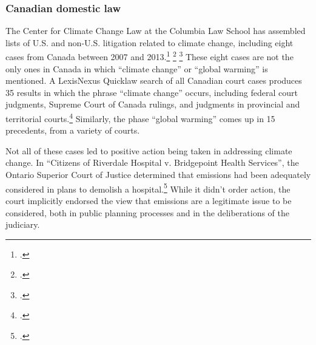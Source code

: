\documentclass[10pt]{article}
\begin{document}
	\subsubsection{Canadian domestic law}
	\label{sec:CanDomesticLaw}



The Center for Climate Change Law at the Columbia Law School has assembled lists of U.S. and non-U.S. litigation related to climate change, including eight cases from Canada between 2007 and 2013.\footcite[][p. 23]{ColumbiaIntl} \footcite[][]{ColumbiaUS} \footcite[See also: ][]{Gerrard2007}
These eight cases are not the only ones in Canada in which ``climate change'' or ``global warming'' is mentioned.
A LexisNexus Quicklaw search of all Canadian court cases produces 35 results in which the phrase ``climate change'' occurs, including federal court judgments, Supreme Court of Canada rulings, and judgments in provincial and territorial courts.\footcite[For a summary of the history of judicial interpretation of the powers of the federal and provincial governments concerning environmental protection, see Chapter 3 of: ][]{Harrison1996}
Similarly, the phase ``global warming'' comes up in 15 precedents, from a variety of courts.



Not all of these cases led to positive action being taken in addressing climate change.
In ``Citizens of Riverdale Hospital v. Bridgepoint Health Services'', the Ontario Superior Court of Justice determined that  emissions had been adequately considered in plans to demolish a hospital.\footcite[][p. 111]{ColumbiaIntl}
While it didn't order action, the court implicitly endorsed the view that  emissions are a legitimate issue to be considered, both in public planning processes and in the deliberations of the judiciary.
\end{document}
